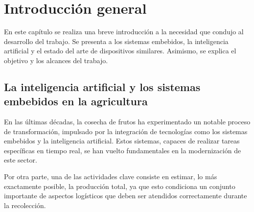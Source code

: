 
\chapter{Introducción general} %

\label{Chapter1} %
\label{IntroGeneral}

En este capítulo se realiza una breve introducción a la necesidad que condujo al desarrollo del trabajo. Se presenta a los sistemas embebidos, la inteligencia artificial y el estado del arte de dispositivos similares. Asimismo, se explica el objetivo y los alcances del trabajo.


\newcommand{\keyword}[1]{\textbf{#1}}
\newcommand{\tabhead}[1]{\textbf{#1}}
\newcommand{\code}[1]{\texttt{#1}}
\newcommand{\file}[1]{\texttt{\bfseries#1}}
\newcommand{\option}[1]{\texttt{\itshape#1}}
\newcommand{\grados}{$^{\circ}$}



\section{La inteligencia artificial y los sistemas embebidos en la agricultura}

En las últimas décadas, la cosecha de frutos ha experimentado un notable proceso de transformación, impulsado por la integración de tecnologías como los sistemas embebidos y la inteligencia artificial. Estos sistemas, capaces de realizar tareas específicas en tiempo real, se han vuelto fundamentales en la modernización de este sector.

Por otra parte, una de las actividades clave consiste en estimar, lo más exactamente posible, la producción total, ya que esto condiciona un conjunto importante de aspectos logísticos que deben ser atendidos correctamente durante la recolección.

